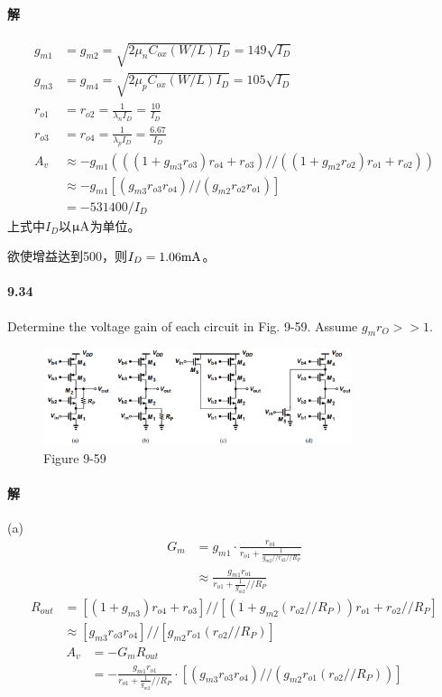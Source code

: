 \documentclass[hyperref, UTF8]{ctexart}
\newcommand{\under}[1]{\frac{1}{#1}}
\newcommand{\milliampere}{{\rm mA}}
\newcommand{\microampere}{{\rm \upmu A}}
\begin{document}
\paragraph{解} 
    \begin{align*}
        g_{m1}&=g_{m2} = \sqrt{2\mu_nC_{ox}(W/L)I_D}=149\sqrt{I_D} \\
        g_{m3}&=g_{m4} = \sqrt{2\mu_pC_{ox}(W/L)I_D}=105\sqrt{I_D} \\
        r_{o1}&=r_{o2} = \under{\lambda_nI_D} = \frac{10}{I_D} \\
        r_{o3}&=r_{o4} = \under{\lambda_pI_D} = \frac{6.67}{I_D} \\
        A_v & \approx -g_{m1}(((1+g_{m3}r_{o3})r_{o4}+r_{o3}) // ((1+g_{m2}r_{o2})r_{o1}+r_{o2})) \\
        & \approx -g_{m1}[(g_{m3}r_{o3}r_{o4})//(g_{m2}r_{o2}r_{o1})] \\
        & = -531400 / I_D
    \end{align*}
    上式中$I_D$以$\microampere$为单位。

    欲使增益达到500，则$I_D=1.06\milliampere$。

\paragraph{9.34} \label{9.34}
    Determine the voltage gain of each circuit in Fig. 9-59. Assume $g_mr_O>>1$.

    \begin{figure}[!htb]
        \centering
        \includegraphics[width=0.805\textwidth]{p9-59.png}
        \caption*{Figure 9-59}
    \end{figure}

\paragraph{解}

    (a) \begin{align*}
        G_m &= g_{m1} \cdot \frac{r_{o1}}{r_{o1}+\under{g_{m2}//r_{o2}//R_P}} \\
        & \approx \frac{g_{m1}r_{o1}}{r_{o1}+\under{g_{m2}}//R_P} 
    \end{align*}
    \begin{align*}
        R_{out} &= [(1+g_{m3})r_{o4}+r_{o3}]//[(1+g_{m2}(r_{o2}//R_P))r_{o1}+r_{o2}//R_P] \\
        & \approx [g_{m3}r_{o3}r_{o4}] // [g_{m2}r_{o1}(r_{o2}//R_P)] 
    \end{align*}
    \begin{align*}
        A_v &= -G_mR_{out} \\
        &= -\frac{g_{m1}r_{o1}}{r_{o1}+\under{g_{m2}}//R_P} \cdot [(g_{m3}r_{o3}r_{o4}) // (g_{m2}r_{o1}(r_{o2}//R_P))]
    \end{align*}
\end{document}
